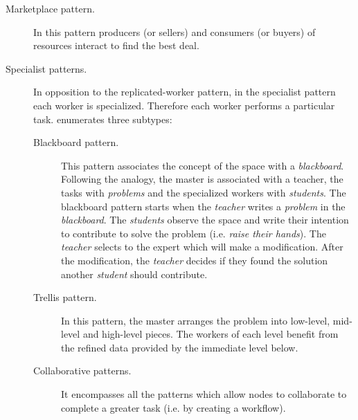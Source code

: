 \begin{description}
   \item[Marketplace pattern.] In this pattern producers (or sellers) and consumers (or buyers) of resources interact to find the best deal.
  \item[Specialist patterns.] In opposition to the replicated-worker pattern, in the specialist pattern each worker is specialized.
                              Therefore each worker performs a particular task.
                              \citeauthor{freeman_javaspaces_1999} enumerates three subtypes:
			      \begin{description}
				  \item[Blackboard pattern.]
					This pattern associates the concept of the space with a \emph{blackboard}.
					Following the analogy, the master is associated with a teacher, the tasks with \emph{problems} and the specialized workers with \emph{students}.
					The blackboard pattern starts when the \emph{teacher} writes a \emph{problem} in the \emph{blackboard}.
					The \emph{students} observe the space and write their intention to contribute to solve the problem (i.e. \emph{raise their hands}).
					The \emph{teacher} selects to the expert which will make a modification.
					After the modification, the \emph{teacher} decides if they found the solution another \emph{student} should contribute.
				  \item [Trellis pattern.]
					In this pattern, the master arranges the problem into low-level, mid-level and high-level pieces.
					The workers of each level benefit from the refined data provided by the immediate level below.
				  \item [Collaborative patterns.]
					It encompasses all the patterns which allow nodes to collaborate to complete a greater task (i.e. by creating a workflow).
			      \end{description}
\end{description}


